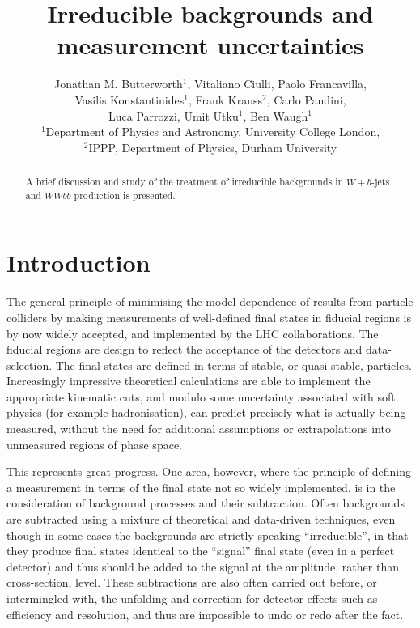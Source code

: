 \documentclass[11pt]{cernrep}
\begin{document}
 
\title{Irreducible backgrounds and measurement uncertainties}

\author{Jonathan M. Butterworth$^1$, Vitaliano Ciulli, Paolo Francavilla,\\ Vasilis Konstantinides$^1$, Frank Krauss$^2$, Carlo Pandini,\\
Luca Parrozzi, Umit Utku$^1$, Ben Waugh$^1$ \\
$^1$Department of Physics and Astronomy, University College London,\\ 
$^2$IPPP, Department of Physics, Durham University}

\maketitle 

\begin{abstract}
A brief discussion and study of the treatment of irreducible backgrounds in $W+b$-jets and $WWbb$ production is presented.
\end{abstract}

\section{Introduction}
\label{sec:intro}

The general principle of minimising the model-dependence of results from particle colliders by making measurements of 
well-defined final states in fiducial regions is by now widely accepted, and implemented by the LHC collaborations. 
The fiducial regions are design to reflect  the acceptance of the detectors and data-selection. 
The final states are defined in terms of stable, or quasi-stable,
particles. Increasingly impressive theoretical calculations are able to implement the appropriate kinematic cuts, and
modulo some uncertainty associated with soft physics (for example hadronisation), can predict precisely what 
is actually being measured, without the need for additional assumptions or extrapolations into unmeasured regions of 
phase space.

This represents great progress. One area, however, where the principle of defining a measurement in terms of the final state
not so widely implemented, is in the consideration of background processes and their subtraction. 
Often backgrounds are subtracted using a mixture of theoretical and data-driven techniques, 
even though in some cases the backgrounds are strictly speaking ``irreducible'', in that they produce final states 
identical to the ``signal'' final state (even in a perfect detector) and thus should be added to the signal 
at the amplitude, rather than cross-section, level. These subtractions are also often carried out before, or intermingled with, 
the unfolding and correction for detector effects such as efficiency and resolution, and thus are impossible to
undo or redo after the fact. 
\end{document}
